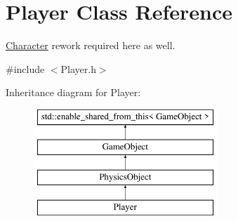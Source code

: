 \hypertarget{class_player}{}\section{Player Class Reference}
\label{class_player}


\hyperlink{class_character}{Character} rework required here as well.  




{\ttfamily \#include $<$Player.\+h$>$}

Inheritance diagram for Player\+:\begin{figure}[H]
\begin{center}
\leavevmode
\includegraphics[height=4.000000cm]{d8/d53/class_player}
\end{center}
\end{figure}
